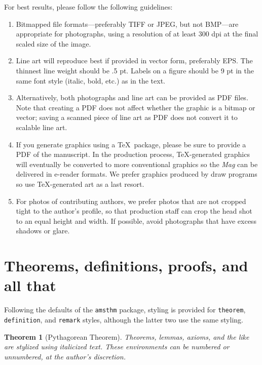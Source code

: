 \documentclass{article}
\theoremstyle{theorem}
\newtheorem{theorem}{Theorem}
\theoremstyle{definition}
\begin{document}
    For best results, please follow the following guidelines:
    \begin{enumerate}
        \item Bitmapped file formats---preferably TIFF or JPEG, but not BMP---are appropriate for photographs, using a resolution of at least 300 dpi at the final scaled size of the image.
        \item Line art will reproduce best if provided in vector form, preferably EPS. The thinnest line weight should be .5 pt.  Labels on a figure should be 9 pt in the same font style (italic, bold, etc.) as in the text.
        \item Alternatively, both photographs and line art can be provided as PDF files.  Note that creating a PDF does not affect whether the graphic is a bitmap or vector; saving a scanned piece of line art as PDF does not convert it to scalable line art.
        \item If you generate graphics using a \TeX\ package, please be sure to provide a PDF of the manuscript.  In the production process, \TeX-generated graphics will eventually be converted to more conventional graphics so the \textit{Mag} can be delivered in e-reader formats.  We prefer graphics produced by draw programs so use \TeX-generated art as a last resort.
        \item For photos of contributing authors, we prefer photos that are not cropped tight to the author's profile, so that production staff can crop the head shot to an equal height and width.  If possible, avoid photographs that have excess shadows or glare.
    \end{enumerate}



    \section{Theorems, definitions, proofs, and all that}

    Following the defaults of the \texttt{amsthm} package, styling is provided for \texttt{theorem}, \texttt{definition}, and \texttt{remark} styles, although the latter two use the same styling.


    \begin{theorem}[Pythagorean Theorem]
        Theorems, lemmas, axioms, and the like are stylized using italicized text. These environments can be numbered or unnumbered, at the author's discretion.
    \end{theorem}
\end{document}
